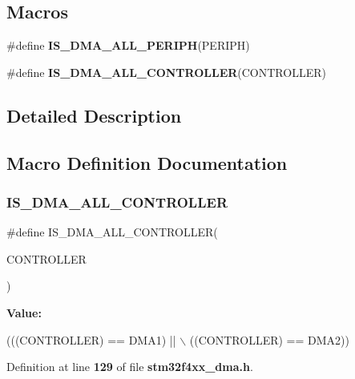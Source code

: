 \subsection*{Macros}
\begin{DoxyCompactItemize}
\item 
\#define \textbf{ I\+S\+\_\+\+D\+M\+A\+\_\+\+A\+L\+L\+\_\+\+P\+E\+R\+I\+PH}(P\+E\+R\+I\+PH)
\item 
\#define \textbf{ I\+S\+\_\+\+D\+M\+A\+\_\+\+A\+L\+L\+\_\+\+C\+O\+N\+T\+R\+O\+L\+L\+ER}(C\+O\+N\+T\+R\+O\+L\+L\+ER)
\end{DoxyCompactItemize}


\subsection{Detailed Description}


\subsection{Macro Definition Documentation}
\mbox{\label{group__DMA__Exported__Constants_gaad08400369c8c129927cdb9cf1baae29}} 
\subsubsection{I\+S\+\_\+\+D\+M\+A\+\_\+\+A\+L\+L\+\_\+\+C\+O\+N\+T\+R\+O\+L\+L\+ER}
{\footnotesize\ttfamily \#define I\+S\+\_\+\+D\+M\+A\+\_\+\+A\+L\+L\+\_\+\+C\+O\+N\+T\+R\+O\+L\+L\+ER(\begin{DoxyParamCaption}\item[{}]{C\+O\+N\+T\+R\+O\+L\+L\+ER }\end{DoxyParamCaption})}

{\bfseries Value\+:}
\begin{DoxyCode}
(((CONTROLLER) == DMA1) || \(\backslash\)
                                           ((CONTROLLER) == DMA2))
\end{DoxyCode}


Definition at line \textbf{ 129} of file \textbf{ stm32f4xx\+\_\+dma.\+h}.


